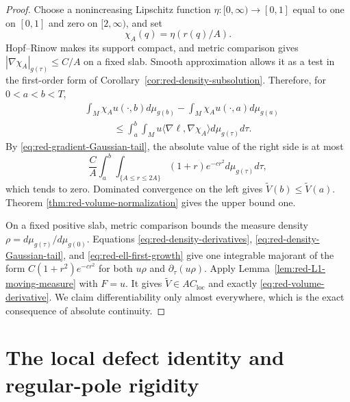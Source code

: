 \documentclass[10pt]{coll-l}
\theoremstyle{definition}
\theoremstyle{remark}
\numberwithin{section}{chapter}
\numberwithin{equation}{chapter}
\begin{document}
\begin{proof}
Choose a nonincreasing Lipschitz function $\eta:[0,\infty)\to[0,1]$ equal
to one on $[0,1]$ and zero on $[2,\infty)$, and set
\begin{equation}
              \chi_A(q)=\eta(r(q)/A).                  \label{eq:red-static-cutoff}
\end{equation}
Hopf--Rinow makes its support compact, and metric comparison gives
$|\nabla\chi_A|_{g(\tau)}\leq C/A$ on a fixed slab.  Smooth approximation
allows it as a test in the first-order form of
Corollary~\ref{cor:red-density-subsolution}.  Therefore, for $0<a<b<T$,
\begin{align}
 &\int_M\chi_Au(\cdot,b)d\mu_{g(b)}
 -\int_M\chi_Au(\cdot,a)d\mu_{g(a)}                   \label{eq:red-volume-cutoff-inequality}\\
 &\hspace{3em}\leq
 \int_a^b\!\!\int_Mu\langle\nabla\ell,\nabla\chi_A\rangle
                  d\mu_{g(\tau)}d\tau.\nonumber
\end{align}
By \eqref{eq:red-gradient-Gaussian-tail}, the absolute value of the right
side is at most
\begin{equation}
 \frac CA\int_a^b\!\!\int_{\{A\leq r\leq2A\}}
          (1+r)e^{-cr^2}d\mu_{g(\tau)}d\tau,             \label{eq:red-volume-flux-error}
\end{equation}
which tends to zero.  Dominated convergence on the left gives
$\widetilde V(b)\leq\widetilde V(a)$.  Theorem
\ref{thm:red-volume-normalization} gives the upper bound one.

On a fixed positive slab, metric comparison bounds the measure density
$\rho=d\mu_{g(\tau)}/d\mu_{g(0)}$.  Equations
\eqref{eq:red-density-derivatives},
\eqref{eq:red-density-Gaussian-tail}, and
\eqref{eq:red-ell-first-growth} give one integrable majorant of the form
$C(1+r^2)e^{-cr^2}$ for both $u\rho$ and
$\partial_\tau(u\rho)$.  Apply
Lemma~\ref{lem:red-L1-moving-measure} with $F=u$.  It gives
$\widetilde V\in AC_{\mathrm{loc}}$ and exactly
\eqref{eq:red-volume-derivative}.  We claim differentiability only almost
everywhere, which is the exact consequence of absolute continuity.
\end{proof}

\section{The local defect identity and regular-pole rigidity}
\label{sec:red-regular-rigidity}
\end{document}
